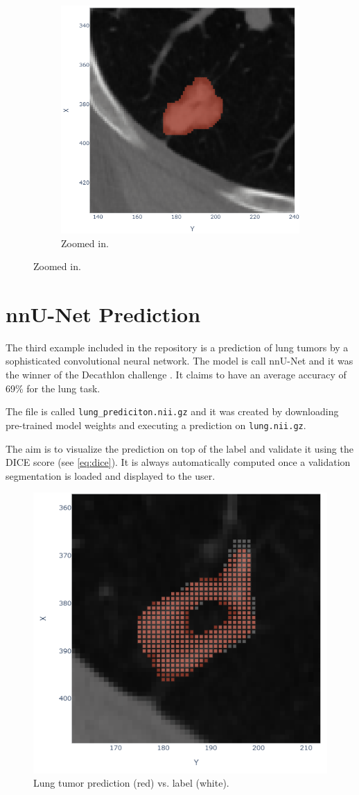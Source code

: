 \begin{figure}[h]
\begin{subfigure}[t]{0.45\linewidth}
		\includegraphics[width=\linewidth]{figures/lung_zoom.png}
		\caption{Zoomed in.}
	\end{subfigure}
\end{figure}

\section{nnU-Net Prediction}
The third example included in the repository is a prediction of lung tumors by a sophisticated convolutional neural network. The model is call nnU-Net and it was the winner of the Decathlon challenge \cite{nnunet}. It claims to have an average accuracy of 69\% for the lung task.

The file is called \texttt{lung\_prediciton.nii.gz} and it was created by downloading pre-trained model weights and executing a prediction on \texttt{lung.nii.gz}.

The aim is to visualize the prediction on top of the label and validate it using the DICE score (see \cref{eq:dice}). It is always automatically computed once a validation segmentation is loaded and displayed to the user.

\begin{figure}[h]
	\centering
	\includegraphics[width=.5\linewidth]{figures/lung_prediction.png}
	\caption{Lung tumor prediction (red) vs. label (white).}
	\label{fig:prediction}
\end{figure}


